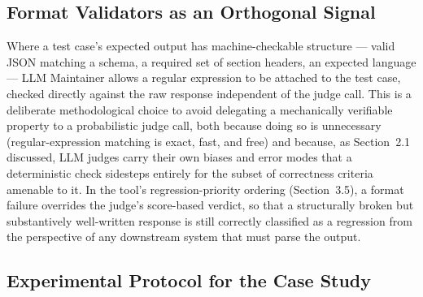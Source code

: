 \documentclass[11pt,a4paper]{article}
\begin{document}
\subsection{Format Validators as an Orthogonal Signal}

Where a test case's expected output has
machine-checkable structure --- valid JSON matching a schema, a
required set of section headers, an expected language --- LLM
Maintainer allows a regular expression to be attached to the test case,
checked directly against the raw response independent of the judge call.
This is a deliberate methodological choice to avoid delegating a
mechanically verifiable property to a probabilistic judge call, both
because doing so is unnecessary (regular-expression matching is exact,
fast, and free) and because, as Section~2.1 discussed, LLM judges carry
their own biases and error modes that a deterministic check sidesteps
entirely for the subset of correctness criteria amenable to it. In the
tool's regression-priority ordering (Section~3.5), a
format failure overrides the judge's score-based
verdict, so that a structurally broken but substantively well-written
response is still correctly classified as a regression from the
perspective of any downstream system that must parse the output.

\subsection{Experimental Protocol for the Case Study}
\end{document}
